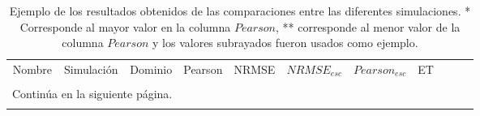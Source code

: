 \newpage
\begin{landscape}


\begin{longtable}{rrrrrrrrrrr}
\caption{Ejemplo de los resultados obtenidos de las comparaciones entre las diferentes simulaciones. * Corresponde al mayor valor en la columna $Pearson$, ** corresponde al menor valor de la columna $Pearson$ y los valores subrayados fueron usados como ejemplo.}
\label{tabla:ejemplo_dominios}\\
\hline
   Nombre & Simulación & Dominio &  Pearson &     NRMSE &  $NRMSE_{esc}$ &  $Pearson_{esc}$ &      ET \\
   
\\ \midrule %
\endhead
\midrule
\multicolumn{3}{r}{{Continúa en la siguiente página.}} \\
\midrule
\endfoot

\bottomrule
\endlastfoot



\end{longtable}
\end{landscape}
